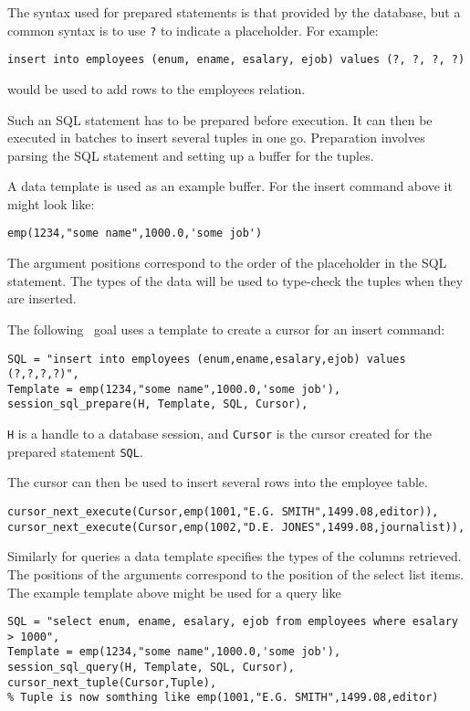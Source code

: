 The syntax used for
prepared statements is that provided by the database, but a common syntax
is to use \verb'?' to indicate a placeholder. For example:
\begin{verbatim}
insert into employees (enum, ename, esalary, ejob) values (?, ?, ?, ?)
\end{verbatim}
would be used to add rows to the employees relation.

Such an SQL statement has to be prepared before execution. It can then
be executed in batches to insert several tuples in one go. Preparation
involves parsing the SQL statement and setting up a buffer for the tuples.

A data template is used as an example buffer. For the insert command above it
might look like:

\begin{verbatim}
emp(1234,"some name",1000.0,'some job')
\end{verbatim}

The argument positions correspond to the order of the placeholder in the
SQL statement.
The types of the data will be used to type-check the tuples when they
are inserted.

The following \eclipse\ goal uses a template to create a cursor for an insert
command:
\begin{verbatim}
SQL = "insert into employees (enum,ename,esalary,ejob) values (?,?,?,?)",
Template = emp(1234,"some name",1000.0,'some job'),
session_sql_prepare(H, Template, SQL, Cursor),
\end{verbatim}
\verb'H' is a handle to a database session, and \verb'Cursor' is the cursor
created for the prepared statement \verb'SQL'.

The cursor can then be used to insert several rows into the employee table.

\begin{verbatim}
cursor_next_execute(Cursor,emp(1001,"E.G. SMITH",1499.08,editor)),
cursor_next_execute(Cursor,emp(1002,"D.E. JONES",1499.08,journalist)),
\end{verbatim}

Similarly for queries a data template specifies the types of the
columns retrieved. The positions of the arguments correspond to
the position of the select list items. The example template above
might be used for a query like

\begin{verbatim}
SQL = "select enum, ename, esalary, ejob from employees where esalary > 1000",
Template = emp(1234,"some name",1000.0,'some job'),
session_sql_query(H, Template, SQL, Cursor),
cursor_next_tuple(Cursor,Tuple),
% Tuple is now somthing like emp(1001,"E.G. SMITH",1499.08,editor)
\end{verbatim}

